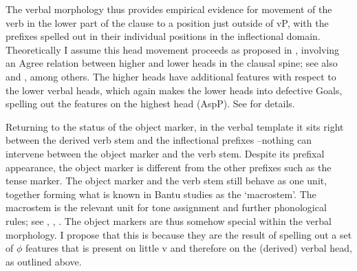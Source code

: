 \documentclass[output=paper
,modfonts
,nonflat]{langsci/langscibook}
\begin{document}

 
\begin{exe}
\end{exe} 


The verbal morphology thus provides empirical evidence for movement of the verb in the lower part of the clause to a position just outside of vP, with the prefixes spelled out in their individual positions in the inflectional domain. Theoretically I assume this head movement proceeds as proposed in \citet{Roberts2010}, involving an Agree relation between higher and lower heads in the clausal spine; see also \citet{Adger2003} and \citet{Bjorkman2011}, among others. The higher heads have additional features with respect to the lower verbal heads, which again makes the lower heads into defective Goals, spelling out the features on the highest head (AspP). See \citet{Roberts2010} for details.

Returning to the status of the object marker, in the verbal template it sits right between the derived verb stem and the inflectional prefixes –nothing can intervene between the object marker and the verb stem. Despite its prefixal appearance, the object marker is different from the other prefixes such as the tense marker. The object marker and the verb stem still behave as one unit, together forming what is known in Bantu studies as the ‘macrostem’. The macrostem is the relevant unit for tone assignment and further phonological rules; see \citet{Hyman2003}, \citet{Hyman_et_al2008}, \citet{Marlo2015}. The object markers are thus somehow special within the verbal morphology. I propose that this is because they are the result of spelling out a set of $\phi$ features that is present on little v and therefore on the (derived) verbal head, as outlined above.
\end{document}
